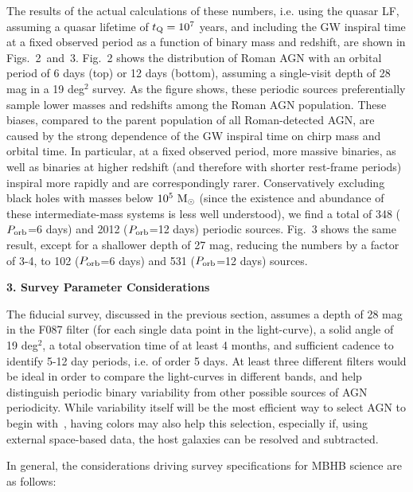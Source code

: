 \documentclass[tightenlines,superscriptaddress,amsmath,amssymb,prl,12pt]{revtex4-1}
\newcommand{\msun}{{\rm M}_\odot}
\begin{document}
The results of the actual calculations of these numbers, i.e. using
the quasar LF, assuming a quasar lifetime of $t_{\rm Q}=10^7$ years,
and including the GW inspiral time at a fixed observed period as a
function of binary mass and redshift, are shown in Figs.~2~and~3.
Fig.~2 shows the distribution of Roman AGN with an orbital period of 6
days (top) or 12 days (bottom), assuming a single-visit depth of 28
mag in a 19 deg$^2$ survey.  As the figure shows, these periodic
sources preferentially sample lower masses and redshifts among the
Roman AGN population.  These biases, compared to the parent population
of all Roman-detected AGN, are caused by the strong dependence of the
GW inspiral time on chirp mass and orbital time. In particular, at a
fixed observed period, more massive binaries, as well as binaries at
higher redshift (and therefore with shorter rest-frame periods)
inspiral more rapidly and are correspondingly rarer.  Conservatively
excluding black holes with masses below $10^5~\msun$ (since the
existence and abundance of these intermediate-mass systems is less
well understood), we find a total of 348 ($P_{\rm orb}$=6 days) and
2012 ($P_{\rm orb}$=12 days) periodic sources.  Fig.~3 shows the same
result, except for a shallower depth of 27 mag, reducing the numbers
by a factor of 3-4, to 102 ($P_{\rm orb}$=6 days) and 531 ($P_{\rm
  orb}$=12 days) sources.

\vspace{\baselineskip}
{\bf 3. Survey Parameter Considerations}
\vspace{0.5\baselineskip}
 
The fiducial survey, discussed in the previous section, assumes a
depth of 28 mag in the F087 filter (for each single data point in the
light-curve), a solid angle of 19 deg$^2$, a total observation time of
at least 4 months, and sufficient cadence to identify 5-12 day
periods, i.e. of order 5 days.  At least three different filters would
be ideal in order to compare the light-curves in different bands, and
help distinguish periodic binary variability from other possible
sources of AGN periodicity.  While variability itself will be the most
efficient way to select AGN to begin with~\cite{IvezicMacLeod2014},
having colors may also help this selection, especially if, using
external space-based data, the host galaxies can be resolved and
subtracted.

In general, the considerations driving survey specifications for MBHB science are as follows:
\end{document}
